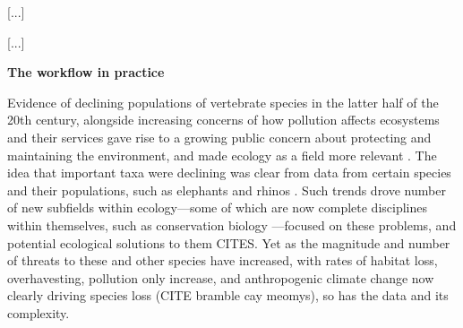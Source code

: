 \documentclass[11pt]{article}
\begin{document}
[...]

[...]

\vspace{0.5cm}
\noindent \textbf{The workflow in practice}

Evidence of declining populations of vertebrate species in the latter half of the 20th century, alongside increasing concerns of how pollution affects ecosystems and their services gave rise to a growing public concern about protecting and maintaining the environment, and made ecology as a field more relevant \cite{soule1999conserving,soule1991conservation}. The idea that important taxa were declining was clear from data from certain species and their populations, such as elephants and rhinos \citep{soule1979benign,leader1990illegal}. Such trends drove number of new subfields within ecology---some of which are now complete disciplines within themselves, such as conservation biology \citep{soule1985conservation}---focused on these problems, and potential ecological solutions to them CITES. Yet as the magnitude and number of threats to these and other species have increased, with rates of habitat loss, overhavesting, pollution only increase, and anthropogenic climate change now clearly driving species loss (CITE bramble cay meomys), so has the data and its complexity. 
\end{document}
